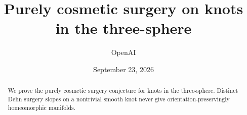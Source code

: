 \documentclass[11pt]{article}
\title{Purely cosmetic surgery on knots in the three-sphere}
\author{OpenAI}
\date{September 23, 2026}
\begin{document}
\maketitle
\begin{abstract}
We prove the purely cosmetic surgery conjecture for knots in the three-sphere.
Distinct Dehn surgery slopes on a nontrivial smooth knot never give
orientation-preservingly homeomorphic manifolds.
\end{abstract}
\tableofcontents












\end{document}
